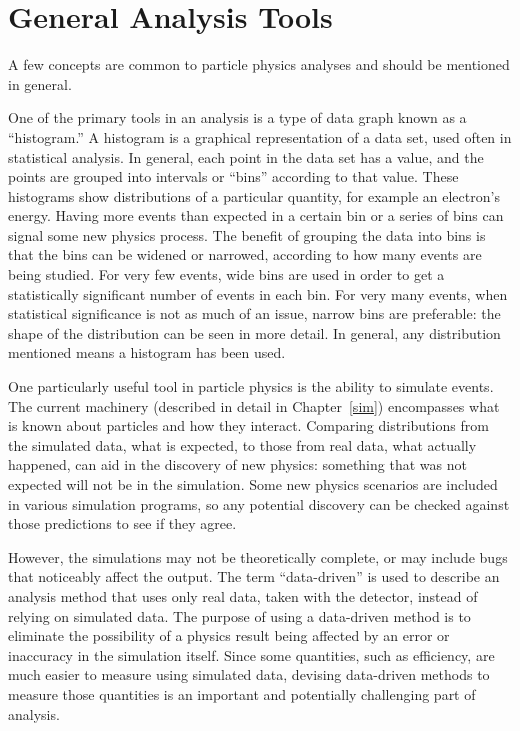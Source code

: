 \section{General Analysis Tools} %


A few concepts are common to particle physics 
analyses and should be mentioned in general.  

One of the primary tools in an analysis 
is a type of data graph known as a ``histogram.'' 
A histogram is a graphical representation 
of a data set, used often in statistical analysis.  
In general, each point in the data set has a value, 
and the points are grouped into intervals or ``bins'' 
according to that value.  
These histograms show distributions of 
a particular quantity, 
for example an electron's energy.  
Having more events than expected in a certain 
bin or a series of bins can 
signal some new physics process.  
The benefit of grouping the data into bins 
is that the bins can be widened or narrowed, 
according to how many events are being studied.  
For very few events, wide bins are used 
in order to get a statistically significant 
number of events in each bin.  
For very many events, when statistical 
significance is not as much of an issue, 
narrow bins are preferable: 
the shape of the distribution 
can be seen in more detail.  
In general, any distribution mentioned 
means a histogram has been used.  

One particularly useful tool in particle physics 
is the ability to simulate events.  
The current machinery 
(described in detail in Chapter~\ref{sim}) 
encompasses what is known about particles 
and how they interact.  
Comparing distributions from 
the simulated data, 
what is expected, 
to those from real data, what actually happened, 
can aid in the discovery of new physics: 
something that was not expected 
will not be in the simulation.  
Some new physics scenarios are 
included in various simulation programs, 
so any potential discovery can be checked 
against those predictions to see if they agree.  

However, the simulations may not be theoretically complete, 
or may include bugs that noticeably affect the output.  
The term ``data-driven'' is used to describe an analysis method 
that uses only real data, taken with the detector, 
instead of relying on simulated data.  
The purpose of using a data-driven method is to 
eliminate the possibility of a physics result 
being affected by an error or inaccuracy 
in the simulation itself.  
Since some quantities, such as efficiency, 
are much easier to measure using simulated data, 
devising data-driven methods to measure those quantities 
is an important and potentially challenging 
part of analysis.  

